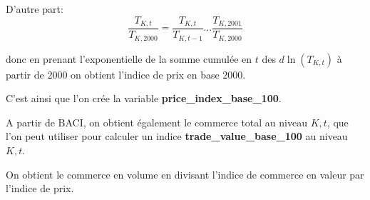 \documentclass[12pt]{article}
\begin{document}
D'autre part:
$$\frac{T_{K,t}}{T_{K,2000}} = \frac{T_{K,t}}{T_{K,t-1}} \dots \frac{T_{K,2001}}{T_{K,2000}}$$

donc en prenant l'exponentielle de la somme cumulée en $t$ des $d\ln(T_{K,t})$ à partir de 2000 on obtient l'indice de prix en base 2000. 

C'est ainsi que l'on crée la variable \textbf{price\_index\_base\_100}. 

A partir de BACI, on obtient également le commerce total au niveau $K, t$, que l'on peut utiliser pour calculer un indice \textbf{trade\_value\_base\_100} au niveau $K, t$. 

On obtient le commerce en volume en divisant l'indice de commerce en valeur par l'indice de prix. 
\end{document}
